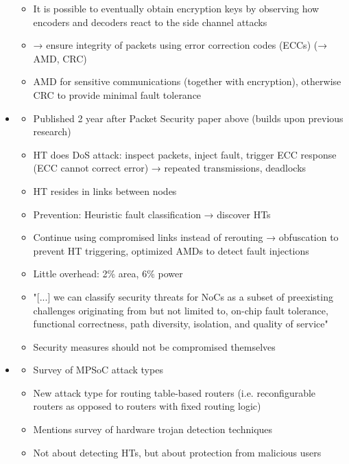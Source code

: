 \begin{itemize}
\begin{itemize}
            \item It is possible to eventually obtain encryption keys by observing how encoders and decoders react to the side channel attacks
            \item → ensure integrity of packets using error correction codes (ECCs) (→ AMD, CRC)
            \item AMD for sensitive communications (together with encryption), otherwise CRC to provide minimal fault tolerance
        \end{itemize}
    \item \textbf{} \checkmark
        \begin{itemize}
            \item Published 2 year after Packet Security paper above (builds upon previous research)
            \item HT does DoS attack: inspect packets, inject fault, trigger ECC response (ECC cannot correct error) → repeated transmissions,
                deadlocks
            \item HT resides in links between nodes
            \item Prevention: Heuristic fault classification → discover HTs
            \item Continue using compromised links instead of rerouting → obfuscation to prevent HT triggering, optimized AMDs to detect fault
                injections
            \item Little overhead: 2\% area, 6\% power
            \item "[...] we can classify security threats for NoCs as a subset of preexisting challenges originating from but not limited to,
                on-chip fault tolerance, functional correctness, path diversity, isolation, and quality of service"
            \item Security measures should not be compromised themselves
        \end{itemize}
    \item \textbf{}
        \begin{itemize}
            \item Survey of MPSoC attack types
            \item New attack type for routing table-based routers (i.e. reconfigurable routers as opposed to routers with fixed routing logic)
            \item Mentions survey of hardware trojan detection techniques
            \item Not about detecting HTs, but about protection from malicious users

\end{itemize}
\end{itemize}
